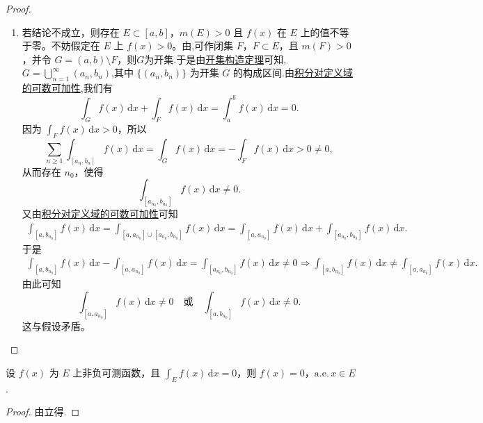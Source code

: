 \documentclass[../../main.tex]{subfiles}
\begin{document}
\begin{proof}
\begin{enumerate}[(1)]
\item 若结论不成立，则存在 $E \subset [a,b]$，$m(E) > 0$ 且 $f(x)$ 在 $E$ 上的值不等于零。不妨假定在 $E$ 上 $f(x) > 0$。由,可作闭集 $F$，$F \subset E$，且 $m(F) > 0$，并令 $G = (a,b) \setminus F$，则$G$为开集.于是由\hyperref[theorem:开集构造定理]{开集构造定理}可知,$G=\bigcup_{n=1}^{\infty}{\left( a_n,b_n \right)}$,其中 $\{ (a_n, b_n) \}$ 为开集 $G$ 的构成区间.由\hyperref[theorem:积分对定义域的可数可加性]{积分对定义域的可数可加性},我们有
\[
\int_G f(x) \, \mathrm{d}x + \int_F f(x) \, \mathrm{d}x = \int_a^b f(x) \, \mathrm{d}x = 0.
\]
因为 $\int_F f(x) \, \mathrm{d}x > 0$，所以
\[
\sum_{n \geqslant 1} \int_{[a_n, b_n]} f(x) \, \mathrm{d}x = \int_G f(x) \, \mathrm{d}x = -\int_F f(x) \, \mathrm{d}x > 0\neq 0,
\]
从而存在 $n_0$，使得
\[
\int_{[a_{n_0}, b_{n_0}]} f(x) \, \mathrm{d}x \neq 0.
\]
又由\hyperref[theorem:积分对定义域的可数可加性]{积分对定义域的可数可加性}可知
\begin{align*}
\int_{[a,b_{n_0}]}{f(x)\,\mathrm{d}x}=\int_{[a,a_{n_0}]\cup [a_{n_0},b_{n_0}]}{f(x)\,\mathrm{d}x}=\int_{[a,a_{n_0}]}{f(x)\,\mathrm{d}x}+\int_{[a_{n_0},b_{n_0}]}{f(x)\,\mathrm{d}x.}
\end{align*}
于是
\begin{align*}
\int_{[a,b_{n_0}]}{f(x)\,\mathrm{d}x}-\int_{[a,a_{n_0}]}{f(x)\,\mathrm{d}x}=\int_{[a_{n_0},b_{n_0}]}{f(x)\,\mathrm{d}x}\ne 0\Rightarrow \int_{[a,b_{n_0}]}{f(x)\,\mathrm{d}x}\ne \int_{[a,a_{n_0}]}{f(x)\,\mathrm{d}x}.
\end{align*}
由此可知
\[
\int_{[a, a_{n_0}]} f(x) \, \mathrm{d}x \neq 0 \quad \text{或} \quad \int_{[a, b_{n_0}]} f(x) \, \mathrm{d}x \neq 0.
\]
这与假设矛盾。
\end{enumerate}
\end{proof}

\begin{corollary}\label{corollary:非负可测函数积分为0则几乎处处为0}
设 \( f(x) \) 为 \( E \) 上非负可测函数，且 \( \int_E f(x)\,\mathrm{d}x = 0 \)，则 \( f(x) = 0 \)，\(\text{a.e.}\, x \in E \). 
\end{corollary}
\begin{proof}
由立得.
\end{proof}
\end{document}

